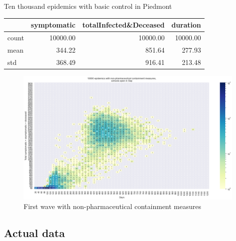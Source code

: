 \documentclass[8pt]{beamer}
\begin{document}
\begin{frame}{Ten thousand epidemics with basic control in Piedmont}


\begin{table}[H]
\center
\tiny

\begin{tabular}{lrrr}
\toprule
{} &  symptomatic &  totalInfected\&Deceased &  duration \\
\midrule
count &     10000.00 &                10000.00 &  10000.00 \\
mean  &       344.22 &                  851.64 &    277.93 \\
std   &       368.49 &                  916.41 &    213.48 \\
\bottomrule
\end{tabular}

\label{basicCTab}
\end{table}

\begin{figure}[H]
\center
\includegraphics[scale=0.22]{10kBasicC.png}
\caption{First wave with non-pharmaceutical containment measures} 
\label{basicC}
\end{figure}

\end{frame}


\subsection{Actual data}
\end{document}
